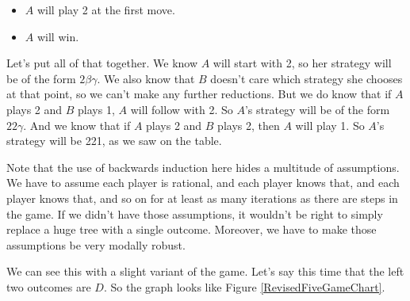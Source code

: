 \documentclass[openany]{book}
\begin{document}
\begin{itemize}
\item $A$ will play 2 at the first move.
\item $A$ will win.
\end{itemize}
Let's put all of that together. We know $A$ will start with 2, so her strategy will be of the form $2 \beta \gamma$. We also know that $B$ doesn't care which strategy she chooses at that point, so we can't make any further reductions. But we do know that if $A$ plays 2 and $B$ plays 1, $A$ will follow with 2. So $A$'s strategy will be of the form $2 2 \gamma$. And we know that if $A$ plays 2 and $B$ plays 2, then $A$ will play 1. So $A$'s strategy will be 221, as we saw on the table.

Note that the use of backwards induction here hides a multitude of assumptions. We have to assume each player is rational, and each player knows that, and each player knows that, and so on for at least as many iterations as there are steps in the game. If we didn't have those assumptions, it wouldn't be right to simply replace a huge tree with a single outcome. Moreover, we have to make those assumptions be very modally robust. 

We can see this with a slight variant of the game. Let's say this time that the left two outcomes are $D$. So the graph looks like Figure \ref{RevisedFiveGameChart}.
\end{document}
